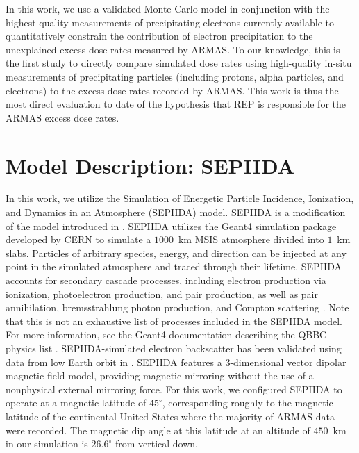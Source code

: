 \documentclass[draft]{agujournal2019}
\newcommand{\mathdeg}{^\circ}
\begin{document}
In this work, we use a validated Monte Carlo model in conjunction with the highest-quality measurements of precipitating electrons currently available to quantitatively constrain the contribution of electron precipitation to the unexplained excess dose rates measured by ARMAS. To our knowledge, this is the first study to directly compare simulated dose rates using high-quality in-situ measurements of precipitating particles (including protons, alpha particles, and electrons) to the excess dose rates recorded by ARMAS. This work is thus the most direct evaluation to date of the hypothesis that REP is responsible for the ARMAS excess dose rates.


  


\section{Model Description: SEPIIDA}
In this work, we utilize the Simulation of Energetic Particle Incidence, Ionization, and Dynamics in an Atmosphere (SEPIIDA) model. SEPIIDA is a modification of the model introduced in . SEPIIDA utilizes the Geant4 simulation package developed by CERN \cite{geant4} to simulate a $1000$~km MSIS atmosphere divided into $1$~km slabs. Particles of arbitrary species, energy, and direction can be injected at any point in the simulated atmosphere and traced through their lifetime. SEPIIDA accounts for secondary cascade processes, including electron production via ionization, photoelectron production, and pair production, as well as pair annihilation, bremsstrahlung photon production, and Compton scattering \cite{berland2023}. Note that this is not an exhaustive list of processes included in the SEPIIDA model. For more information, see the Geant4 documentation describing the QBBC physics list \cite{qbbc-docs}. SEPIIDA-simulated electron backscatter has been validated using data from low Earth orbit in . SEPIIDA features a 3-dimensional vector dipolar magnetic field model, providing magnetic mirroring without the use of a nonphysical external mirroring force. For this work, we configured SEPIIDA to operate at a magnetic latitude of $45\mathdeg$, corresponding roughly to the magnetic latitude of the continental United States where the majority of ARMAS data were recorded. The magnetic dip angle at this latitude at an altitude of $450$~km in our simulation is $26.6\mathdeg$ from vertical-down.
\end{document}
